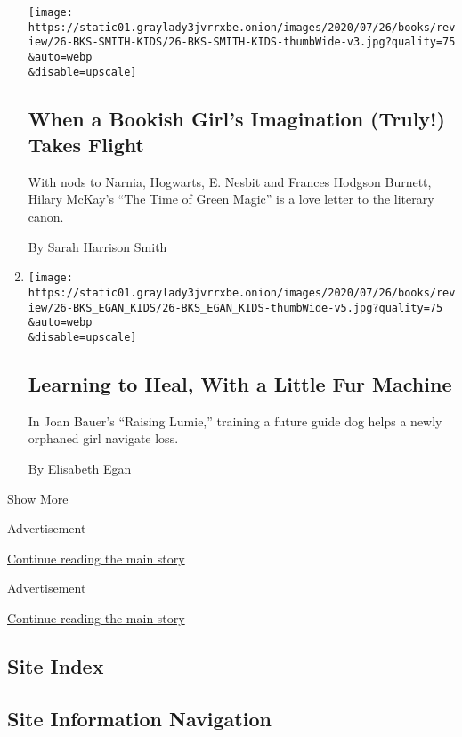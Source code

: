 \begin{enumerate}
  \texttt{[image: https://static01.graylady3jvrrxbe.onion/images/2020/07/26/books/review/26-BKS-SMITH-KIDS/26-BKS-SMITH-KIDS-thumbWide-v3.jpg?quality=75\\\&auto=webp\\\&disable=upscale]}

  \hypertarget{when-a-bookish-girls-imagination-truly-takes-flight}{%
  \subsection{When a Bookish Girl's Imagination (Truly!) Takes
  Flight}\label{when-a-bookish-girls-imagination-truly-takes-flight}}

  With nods to Narnia, Hogwarts, E. Nesbit and Frances Hodgson Burnett,
  Hilary McKay's ``The Time of Green Magic'' is a love letter to the
  literary canon.

  By Sarah Harrison Smith
\item
  \href{/2020/07/18/books/review/joan-bauer-raising-lumie.html}{}

  \texttt{[image: https://static01.graylady3jvrrxbe.onion/images/2020/07/26/books/review/26-BKS\_EGAN\_KIDS/26-BKS\_EGAN\_KIDS-thumbWide-v5.jpg?quality=75\\\&auto=webp\\\&disable=upscale]}

  \hypertarget{learning-to-heal-with-a-little-fur-machine}{%
  \subsection{Learning to Heal, With a Little Fur
  Machine}\label{learning-to-heal-with-a-little-fur-machine}}

  In Joan Bauer's ``Raising Lumie,'' training a future guide dog helps a
  newly orphaned girl navigate loss.

  By Elisabeth Egan
\end{enumerate}

Show More

Advertisement

\protect\hyperlink{after-mid2}{Continue reading the main story}

Advertisement

\protect\hyperlink{after-mktg}{Continue reading the main story}

\hypertarget{site-index}{%
\subsection{Site Index}\label{site-index}}

\hypertarget{site-information-navigation}{%
\subsection{Site Information
Navigation}\label{site-information-navigation}}

